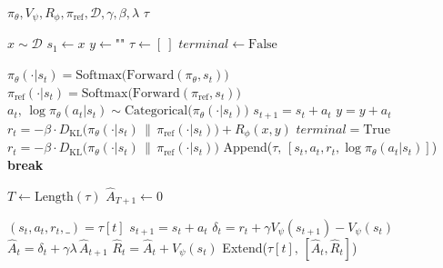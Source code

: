 \documentclass{article}
\begin{document}

\begin{algorithm}
\caption*{\textbf{Algorithm 1:} Step-wise Trajectory Sampling}
\begin{algorithmic}[1]
\Require $\pi_{\theta}, V_{\psi}, R_{\phi}, \pi_{\text{ref}}, \mathcal{D}, \gamma, \beta, \lambda$
\Ensure $\tau$

\State $x \sim \mathcal{D}$ 
\State $s_1 \gets x$ 
\State $y \gets \text{""}$ 
\State $\tau \gets [\ ]$ 
\State $terminal \gets \text{False}$ 

    \State $\pi_\theta(\cdot|s_t) = \text{Softmax}\big(\text{Forward}(\pi_{\theta}, s_t)\big)$
    \State $\pi_\text{ref}(\cdot|s_t) = \text{Softmax}\big(\text{Forward}(\pi_{\text{ref}}, s_t)\big)$
    \State $a_t,\, \log\pi_{\theta}(a_t|s_t) \sim \text{Categorical}\big(\pi_\theta(\cdot|s_t)\big)$ 
    \State $s_{t+1} = s_t + a_t$
    \State $y = y + a_t$
     
        \State $r_t = -\beta{\cdot}D_{\text{KL}}\big(\pi_\theta(\cdot|s_t) \,\|\, \pi_\text{ref}(\cdot|s_t)\big) + R_\phi(x,y)$
        \State $terminal = \text{True}$
    \Else
        \State $r_t = -\beta{\cdot}D_{\text{KL}}\big(\pi_\theta(\cdot|s_t) \,\|\, \pi_\text{ref}(\cdot|s_t)\big)$
    \EndIf
    \State Append\big($\tau,\, [s_t, a_t, r_t, \log\pi_{\theta}(a_t|s_t)]$\big) 
        \State \textbf{break}
    \EndIf
\EndFor

\State $T \gets \text{Length}(\tau)$
\State $\hat{A}_{T+1} \gets 0$ 

    \State $(s_t, a_t, r_t, \_) = \tau[t]$
    \State $s_{t+1} = s_t + a_t$
    \State $\delta_t = r_t + \gamma V_{\psi}(s_{t+1}) - V_{\psi}(s_t)$
    \State $\hat{A}_t = \delta_t + \gamma\lambda\,\hat{A}_{t+1}$ 
    \State $\hat{R}_t = \hat{A}_t + V_{\psi}(s_t)$ 
    \State Extend\big($\tau[t],\, [\hat{A}_t, \hat{R}_t]$\big) 
\EndFor

\end{algorithmic}
\end{algorithm}
\end{document}
